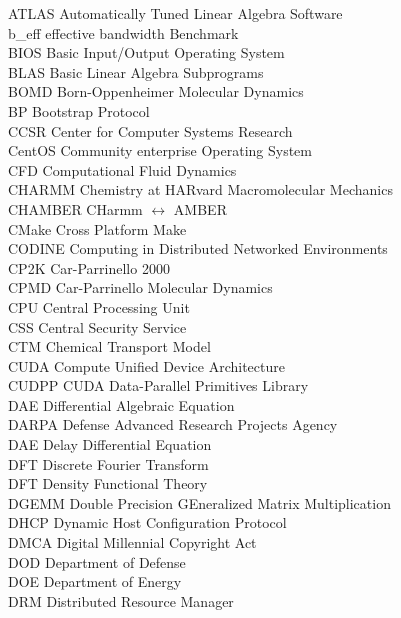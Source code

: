 \begin{tabbing}
ATLAS   \> Automatically Tuned Linear Algebra Software\\
b\_eff  \> effective bandwidth Benchmark\\
BIOS    \> Basic Input/Output Operating System\\
BLAS    \> Basic Linear Algebra Subprograms\\
BOMD    \> Born-Oppenheimer Molecular Dynamics\\
BP      \> Bootstrap Protocol\\
CCSR    \> Center for Computer Systems Research\\
CentOS  \> Community enterprise Operating System\\
CFD     \> Computational Fluid Dynamics\\
CHARMM  \> Chemistry at HARvard Macromolecular Mechanics\\
CHAMBER \> CHarmm $\leftrightarrow$ AMBER\\
CMake   \> Cross Platform Make\\
CODINE  \> Computing in Distributed Networked Environments\\
CP2K    \> Car-Parrinello 2000\\
CPMD    \> Car-Parrinello Molecular Dynamics\\
CPU     \> Central Processing Unit\\
CSS     \> Central Security Service\\
CTM     \> Chemical Transport Model\\
CUDA    \> Compute Unified Device Architecture\\
CUDPP   \> CUDA Data-Parallel Primitives Library\\
DAE     \> Differential Algebraic Equation\\
DARPA   \> Defense Advanced Research Projects Agency\\
DAE     \> Delay Differential Equation\\
DFT     \> Discrete Fourier Transform\\
DFT     \> Density Functional Theory\\
DGEMM   \> Double Precision GEneralized Matrix Multiplication\\
DHCP    \> Dynamic Host Configuration Protocol\\
DMCA    \> Digital Millennial Copyright Act\\
DOD     \> Department of Defense\\
DOE     \> Department of Energy\\
DRM     \> Distributed Resource Manager\\

\end{tabbing}
